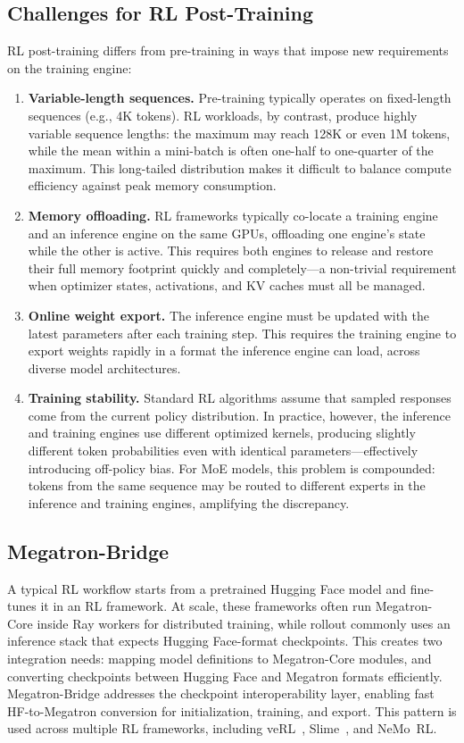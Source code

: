 \documentclass[10pt,logo,copyright]{nvidiatechreport}
\begin{document}
\subsection{Challenges for RL Post-Training}
RL post-training differs from pre-training in ways that impose new requirements on the training engine:

\begin{enumerate}
    \item \textbf{Variable-length sequences.} Pre-training typically operates on fixed-length sequences (e.g., 4K tokens). RL workloads, by contrast, produce highly variable sequence lengths: the maximum may reach 128K or even 1M tokens, while the mean within a mini-batch is often one-half to one-quarter of the maximum. This long-tailed distribution makes it difficult to balance compute efficiency against peak memory consumption.
    \item \textbf{Memory offloading.} RL frameworks typically co-locate a training engine and an inference engine on the same GPUs, offloading one engine's state while the other is active. This requires both engines to release and restore their full memory footprint quickly and completely---a non-trivial requirement when optimizer states, activations, and KV caches must all be managed.
    \item \textbf{Online weight export.} The inference engine must be updated with the latest parameters after each training step. This requires the training engine to export weights rapidly in a format the inference engine can load, across diverse model architectures.
    \item \textbf{Training stability.} Standard RL algorithms assume that sampled responses come from the current policy distribution. In practice, however, the inference and training engines use different optimized kernels, producing slightly different token probabilities even with identical parameters---effectively introducing off-policy bias. For MoE models, this problem is compounded: tokens from the same sequence may be routed to different experts in the inference and training engines, amplifying the discrepancy.
\end{enumerate}
\subsection{Megatron-Bridge}
A typical RL workflow starts from a pretrained Hugging Face model and fine-tunes it in an RL framework. At scale, these frameworks often run Megatron-Core inside Ray workers for distributed training, while rollout commonly uses an inference stack that expects Hugging Face-format checkpoints. This creates two integration needs: mapping model definitions to Megatron-Core modules, and converting checkpoints between Hugging Face and Megatron formats efficiently. Megatron-Bridge addresses the checkpoint interoperability layer, enabling fast HF-to-Megatron conversion for initialization, training, and export. This pattern is used across multiple RL frameworks, including veRL~\cite{sheng2024hybridflow}, Slime~\cite{slime_github}, and NeMo~RL.
\end{document}

